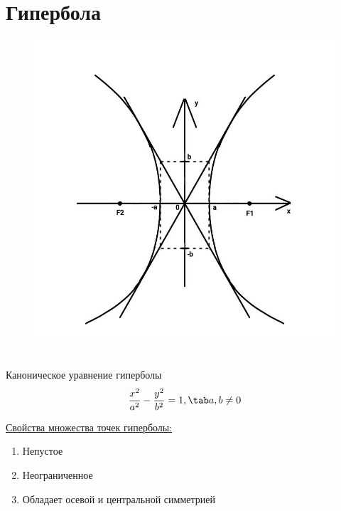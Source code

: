 \section{Гипербола}

\begin{figure}
    \includegraphics[width=1.0\linewidth]{images/гипербола1.jpeg}
\end{figure}

\tab\\

Каноническое уравнение гиперболы
\[
\dfrac{x^2}{a^2} - \dfrac{y^2}{b^2} = 1, \tab a, b \neq 0
\]

\underline{Свойства множества точек гиперболы:}
\begin{enumerate}
    \item Непустое
    \item Неограниченное
    \item Обладает осевой и центральной симметрией
\end{enumerate}

\tab\\ \tab\\ \tab\\ \tab\\ \tab\\ \tab\\ \tab\\ \tab\\ \tab\\


